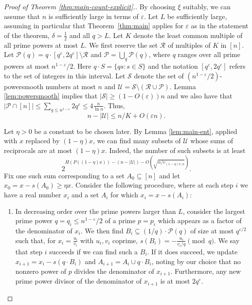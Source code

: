 \documentclass{daj}
\newcommand{\eps}{\varepsilon}
\newcommand{\cS}{\mathcal{S}}
\newcommand{\cR}{\mathcal{R}}
\newcommand{\cP}{\mathcal{P}}
\newcommand{\cU}{\mathcal{U}}
\begin{document}
\begin{proof}[Proof of Theorem \ref{thm:main-count-explicit}.]
By choosing $\xi$ suitably, we can assume that $n$ is sufficiently large in terms of $\eps$. Let $L$ be sufficiently large, assuming in particular that Theorem~\ref{thm:main} applies for $\eps$ as in the statement of the theorem, $\delta = \frac 12$ and all $q > L$. 
Let $K$ denote the least common multiple of all prime powers at most $L$. 
We first reserve the set $\cR$ of multiples of $K$ in $[n]$. 
Let $\cP(q) = q\cdot [q^{\eps}, 2q^{\eps}] \setminus \cR$ and $\cP = \bigcup_{q} \cP(q)$, where $q$ ranges over all prime powers at most $n^{1-\eps}/2$. Here $q\cdot S = \{qs:s\in S\}$ and the notation $[q^{\eps},2q^{\eps}]$ refers to the set of integers in this interval. 
Let $\cS$ denote the set of $(n^{1-\eps}/2)$-powersmooth numbers at most $n$ and $\cU = \cS \setminus (\cR \cup \cP)$. Lemma \ref{lem:powersmooth} implies that $|\cS| \ge (1-O(\eps))n$ and we also have that $|\cP \cap [n]| \le \sum_{q\le n^{1-\eps}}2q^{\eps} \le 4 \frac{n}{\ln n}$. Thus, 
\begin{equation} \label{eq:cU-est}
    n-|\cU| \le n/K + O(\eps n).
\end{equation}



Let $\eta>0$ be a constant to be chosen later. By Lemma \ref{lem:main-ent}, applied with $x$ replaced by $(1-\eta)x$, we can find many subsets of $\cU$ whose sums of reciprocals are at most $(1-\eta)x$. Indeed, the number of such subsets is at least 
\[
    2^{H(P((1-\eta)x)) - (n - |\cU|) - O(\sqrt{n/c_{(1-\eta)x,n}})}. 
\]
Fix one such sum corresponding to a set $A_0 \subseteq [n]$ and let $x_0 = x - s(A_0) \ge \eta x$. Consider the following procedure, where at each step $i$ we have a real number $x_i$ and a set $A_i$ for which $x_i = x - s(A_i)$: 
\begin{enumerate}
    \item In decreasing order over the prime powers larger than $L$, consider the largest prime power $q = q_i \le n^{1-\eps}/2$ of a prime $p = p_i$  which appears as a factor of the denominator of $x_{i}$. 
    We then find $B_i \subseteq (1/q)\cdot \cP(q)$ of size at most $q^{\eps/2}$ such that, for $x_{i} = \frac{u_{i}}{v_{i}}$ with $u_{i}, v_{i}$ coprime, $s(B_i) = -\frac{u_{i}}{v_i/q} \pmod q$. 
    We say that step $i$ succeeds if we can find such a $B_i$. If it does succeed, we update $x_{i+1} = x_i - s(q \cdot B_i)$ and $A_{i+1} = A_i \cup q \cdot B_i$, noting by our choice that no nonzero power of $p$ divides the denominator of $x_{i+1}$. Furthermore, any new prime power divisor of the denominator of $x_{i+1}$ is at most $2q^{\eps}$. 
    

\end{enumerate}
\end{proof}
\end{document}
